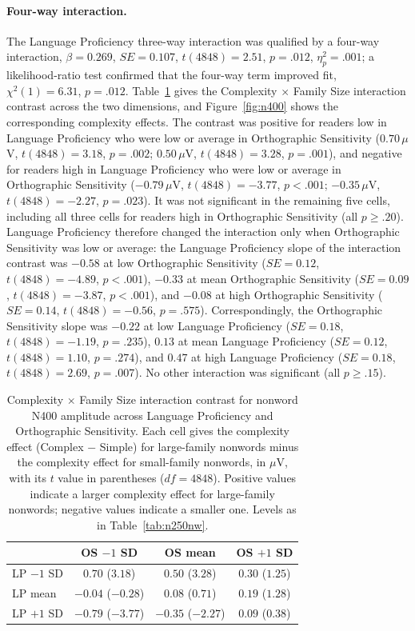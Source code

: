 \paragraph*{Four-way interaction.} The Language Proficiency three-way interaction was qualified by a four-way interaction, $\beta = 0.269$, $SE = 0.107$, $t(4848) = 2.51$, $p = .012$, $\eta^2_p = .001$; a likelihood-ratio test confirmed that the four-way term improved fit, $\chi^2(1) = 6.31$, $p = .012$. Table~\ref{tab:n400nw} gives the Complexity $\times$ Family Size interaction contrast across the two dimensions, and Figure~\ref{fig:n400} shows the corresponding complexity effects. The contrast was positive for readers low in Language Proficiency who were low or average in Orthographic Sensitivity ($0.70\,\mu$V, $t(4848) = 3.18$, $p = .002$; $0.50\,\mu$V, $t(4848) = 3.28$, $p = .001$), and negative for readers high in Language Proficiency who were low or average in Orthographic Sensitivity ($-0.79\,\mu$V, $t(4848) = -3.77$, $p < .001$; $-0.35\,\mu$V, $t(4848) = -2.27$, $p = .023$). It was not significant in the remaining five cells, including all three cells for readers high in Orthographic Sensitivity (all $p \geq .20$). Language Proficiency therefore changed the interaction only when Orthographic Sensitivity was low or average: the Language Proficiency slope of the interaction contrast was $-0.58$ at low Orthographic Sensitivity ($SE = 0.12$, $t(4848) = -4.89$, $p < .001$), $-0.33$ at mean Orthographic Sensitivity ($SE = 0.09$, $t(4848) = -3.87$, $p < .001$), and $-0.08$ at high Orthographic Sensitivity ($SE = 0.14$, $t(4848) = -0.56$, $p = .575$). Correspondingly, the Orthographic Sensitivity slope was $-0.22$ at low Language Proficiency ($SE = 0.18$, $t(4848) = -1.19$, $p = .235$), $0.13$ at mean Language Proficiency ($SE = 0.12$, $t(4848) = 1.10$, $p = .274$), and $0.47$ at high Language Proficiency ($SE = 0.18$, $t(4848) = 2.69$, $p = .007$). No other interaction was significant (all $p \geq .15$).

\begin{table}[htbp]
	\centering
	\small
	\caption{Complexity $\times$ Family Size interaction contrast for nonword N400 amplitude across Language Proficiency and Orthographic Sensitivity. Each cell gives the complexity effect (Complex $-$ Simple) for large-family nonwords minus the complexity effect for small-family nonwords, in $\mu$V, with its $t$ value in parentheses ($df = 4848$). Positive values indicate a larger complexity effect for large-family nonwords; negative values indicate a smaller one. Levels as in Table~\ref{tab:n250nw}.}
	\label{tab:n400nw}
	\begin{tabular}{lccc}
		\toprule
		& OS $-1$ SD & OS mean & OS $+1$ SD \\
		\midrule
		LP $-1$ SD & $0.70$ ($3.18$) & $0.50$ ($3.28$) & $0.30$ ($1.25$) \\
		LP mean & $-0.04$ ($-0.28$) & $0.08$ ($0.71$) & $0.19$ ($1.28$) \\
		LP $+1$ SD & $-0.79$ ($-3.77$) & $-0.35$ ($-2.27$) & $0.09$ ($0.38$) \\
		\bottomrule
	\end{tabular}
\end{table}

